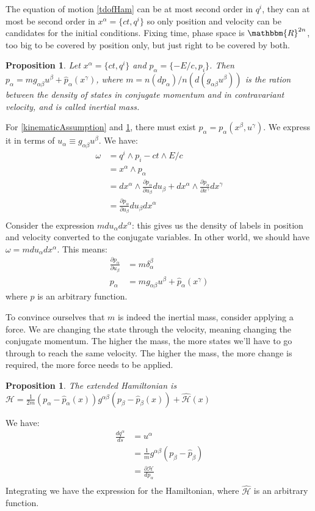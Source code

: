 \documentclass[aps,pra,10pt,twocolumn,floatfix,nofootinbib]{revtex4-1}
\newtheorem{prop}[thm]{Proposition}
\theoremstyle{definition}
\begin{document}
The equation of motion \ref{tdofHam} can be at most second order in $q^i$, they can at most be second order in $x^\alpha=\{ct, q^i\}$ so only position and velocity can be candidates for the initial conditions. Fixing time, phase space is $\mathbbm{R}^{2n}$, too big to be covered by position only, but just right to be covered by both.

\begin{prop}\label{kineticMomentum}
Let $x^\alpha=\{ct, q^i\}$ and $p_\alpha=\{-E/c, p_i\}$. Then $p_\alpha= m g_{\alpha \beta}u^\beta + \hat{p}_\alpha(x^\gamma)$, where $m=n(dp_\alpha)/n(d(g_{\alpha \beta}u^\beta))$ is the ration between the density of states in conjugate momentum and in contravariant velocity, and is called \emph{inertial mass}.
\end{prop}

For \ref{kinematicAssumption} and \ref{kineticMomentum}, there must exist $p_\alpha=p_\alpha(x^\beta , u^\gamma)$. We express it in terms of $u_\alpha\equiv g_{\alpha \beta} u^\beta$. We have:
\begin{align*}
\omega &= q^i\wedge p_i - ct \wedge E/c \\
&=x^\alpha \wedge p_\alpha \\
&=dx^\alpha \wedge \frac{\partial p_\alpha}{\partial u_\beta}du_\beta + dx^\alpha \wedge \frac{\partial p_\alpha}{\partial x^\gamma}dx^\gamma \\
&=\frac{\partial p_\alpha}{\partial u_\beta}du_\beta dx^\alpha \\
\end{align*}
Consider the expression $m du_\alpha dx^\alpha$: this gives us the density of labels in position and velocity converted to the conjugate variables. In other world, we should have $\omega=m du_\alpha dx^\alpha$. This means:
\begin{align*}
\frac{\partial p_\alpha}{\partial u_\beta} &= m \delta^\beta_\alpha \\
p_\alpha &= m g_{\alpha \beta}u^\beta + \hat{p}_\alpha(x^\gamma)
\end{align*}
where $\hat{p}$ is an arbitrary function.

To convince ourselves that $m$ is indeed the inertial mass, consider applying a force. We are changing the state through the velocity, meaning changing the conjugate momentum. The higher the mass, the more states we'll have to go through to reach the same velocity. The higher the mass, the more change is required, the more force needs to be applied.

\begin{prop}\label{kineticHamiltonian}
The extended Hamiltonian is $\mathcal{H}=\frac{1}{2m}(p_\alpha-\hat{p}_\alpha(x))g^{\alpha\beta}(p_\beta-\hat{p}_\beta(x))+\hat{\mathcal{H}}(x)$
\end{prop}
We have:
\begin{align*}
\frac{dq^\alpha}{ds} &= u^\alpha \\
&= \frac{1}{m}g^{\alpha\beta}(p_\beta-\hat{p}_\beta) \\
&= \frac{\partial \mathcal{H}}{dp_\alpha} \\
\end{align*}
Integrating we have the expression for the Hamiltonian, where $\hat{\mathcal{H}}$ is an arbitrary function.
\end{document}
